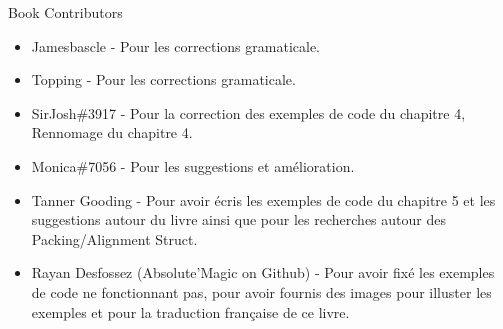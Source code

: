 \large Book Contributors \newline
\begin{itemize}
	\item Jamesbascle - Pour les corrections gramaticale.
	\item Topping - Pour les corrections gramaticale.
	\item SirJosh\#3917 - Pour la correction des exemples de code du chapitre 4, Rennomage du chapitre 4.
	\item Monica\#7056 - Pour les suggestions et amélioration.
	\item Tanner Gooding - Pour avoir écris les exemples de code du chapitre 5 et les suggestions autour du livre ainsi que pour les recherches autour des Packing/Alignment Struct.
	\item Rayan Desfossez (Absolute'Magic on Github) - Pour avoir fixé les exemples de code ne fonctionnant pas, pour avoir fournis des images pour illuster les exemples et pour la traduction française de ce livre.
\end{itemize}

\newpage
